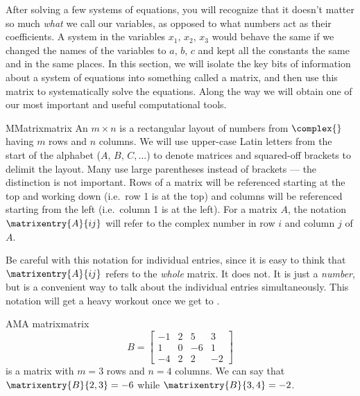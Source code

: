 %
After solving a few systems of equations, you will recognize that it doesn't matter so much {\em what} we call our variables, as opposed to what numbers act as their coefficients.  A system in the variables $x_1,\,x_2,\,x_3$  would behave the same if we changed the names of the variables to $a,\,b,\,c$ and kept all the constants the same and in the same places.  In this section, we will isolate the key bits of information about a system of equations into something called a matrix, and then use this matrix to systematically solve the equations.  Along the way we will obtain one of our most important and useful computational tools.
%
%
\begin{definition}{M}{Matrix}{matrix}
An $m\times n$  is a rectangular layout of numbers from $\complex{\null}$ having $m$ rows and $n$ columns.  We will use upper-case Latin letters from the start of the alphabet ($A,\,B,\,C,\dotsc$) to denote matrices and squared-off brackets to delimit the layout.  Many use large parentheses instead of brackets --- the distinction is not important.  Rows of a matrix will be referenced starting at the top and working down (i.e.\ row 1 is at the top) and columns will be referenced starting from the left (i.e.\ column 1 is at the left).  For a matrix $A$, the notation $\matrixentry{A}{ij}$ will refer to the complex number in row $i$ and column $j$ of $A$.
\end{definition}
%
Be careful with this notation for individual entries, since it is easy to think that $\matrixentry{A}{ij}$ refers to the {\em whole} matrix.  It does not.  It is just a {\em number}, but is a convenient way to talk about the individual entries simultaneously.  This notation will get a heavy workout once we get to .
%
\begin{example}{AM}{A matrix}{matrix}
%
\begin{equation*}
B=\begin{bmatrix}
-1&2&5&3\\
1&0&-6&1\\
-4&2&2&-2
\end{bmatrix}
\end{equation*}
%
is a matrix with $m=3$ rows and $n=4$ columns.  We can say that $\matrixentry{B}{2,3}=-6$ while $\matrixentry{B}{3,4}=-2$.
%
\end{example}
